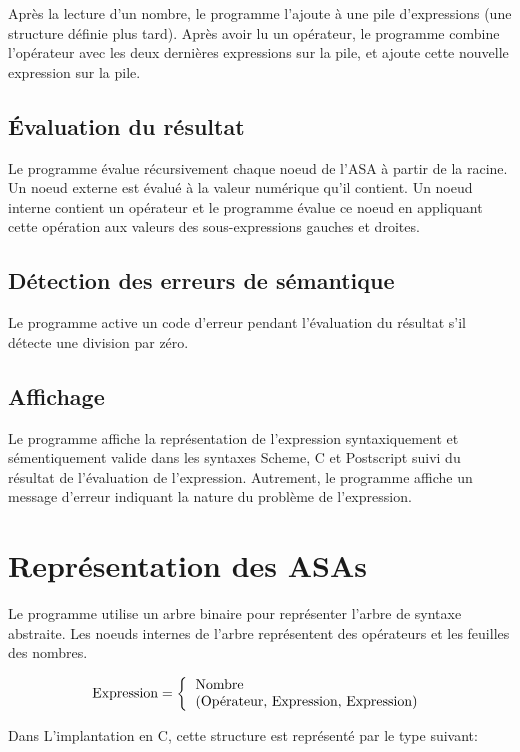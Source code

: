 \documentclass[10pt]{report}
\begin{document}
Après la lecture d'un nombre, le programme l'ajoute à une pile d'expressions
(une structure définie plus tard).  Après avoir lu un opérateur, le programme
combine l'opérateur avec les deux dernières expressions sur la pile, et ajoute
cette nouvelle expression sur la pile.

\subsection{Évaluation du résultat}

Le programme évalue récursivement chaque noeud de l'ASA à partir de la
racine. Un noeud externe est évalué à la valeur numérique qu'il contient. Un
noeud interne contient un opérateur et le programme évalue ce noeud en
appliquant cette opération aux valeurs des sous-expressions gauches et
droites.

\subsection{Détection des erreurs de sémantique}

Le programme active un code d'erreur pendant l'évaluation du résultat s'il
détecte une division par zéro.


\subsection{Affichage}

Le programme affiche la représentation de l'expression syntaxiquement et
sémentiquement valide dans les syntaxes Scheme, C et Postscript suivi du
résultat de l'évaluation de l'expression.  Autrement, le programme affiche un
message d'erreur indiquant la nature du problème de l'expression.


\section{Représentation des ASAs}

Le programme utilise un arbre binaire pour représenter l'arbre de syntaxe
abstraite. Les noeuds internes de l'arbre représentent des opérateurs et les
feuilles des nombres.

\[
\text{Expression} =
\left\{
\begin{tabular}{l}
  \text{Nombre} \\
  \text{(Opérateur, Expression, Expression)}
\end{tabular}
\right.
\]

Dans L'implantation en C, cette structure est représenté par le type
suivant:
\end{document}
